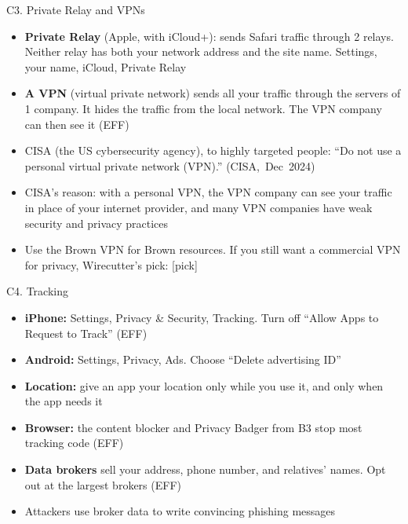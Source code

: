 \documentclass[11pt]{beamer}
\newcommand{\srccite}[1]{{\scriptsize\textcolor{citecol}{#1}}}
\newcommand{\vfy}{\unskip}
\newcommand{\vfy}{\unskip\nobreakspace{\scriptsize\textcolor{citecol}{[verify]}}}
\renewcommand{\srccite}[1]{{\scriptsize\textcolor{citecol}{\mbox{#1}}}}
\newcommand{\fillin}[1]{{\textcolor{featblue}{[#1]}}}
\begin{document}
\begin{frame}{C3. Private Relay and VPNs}
\pause
\begin{itemize}\setlength\itemsep{7pt}
\item \textbf{Private Relay} (Apple, with iCloud+): sends Safari traffic through 2 relays. Neither relay has both your network address and the site name. Settings, your name, iCloud, Private Relay \vfy \pause
\item \textbf{A VPN} (virtual private network) sends all your traffic through the servers of 1 company. It hides the traffic from the local network. The VPN company can then see it \srccite{(EFF)} \vfy \pause
\item CISA (the US cybersecurity agency), to highly targeted people: ``Do not use a personal virtual private network (VPN).'' \srccite{(CISA, Dec 2024)} \vfy \pause
\item CISA's reason: with a personal VPN, the VPN company can see your traffic in place of your internet provider, and many VPN companies have weak security and privacy practices \vfy \pause
\item Use the Brown VPN for Brown resources. If you still want a commercial VPN for privacy, Wirecutter's pick: \fillin{pick}
\end{itemize}
\end{frame}


\begin{frame}{C4. Tracking}
\pause
\begin{itemize}\setlength\itemsep{7pt}
\item \textbf{iPhone:} Settings, Privacy \& Security, Tracking. Turn off ``Allow Apps to Request to Track'' \srccite{(EFF)} \vfy \pause
\item \textbf{Android:} Settings, Privacy, Ads. Choose ``Delete advertising ID'' \vfy \pause
\item \textbf{Location:} give an app your location only while you use it, and only when the app needs it \pause
\item \textbf{Browser:} the content blocker and Privacy Badger from B3 stop most tracking code \srccite{(EFF)} \vfy \pause
\item \textbf{Data brokers} sell your address, phone number, and relatives' names. Opt out at the largest brokers \srccite{(EFF)} \vfy \pause
\item[$\rightarrow$] Attackers use broker data to write convincing phishing messages
\end{itemize}
\end{frame}
\end{document}
